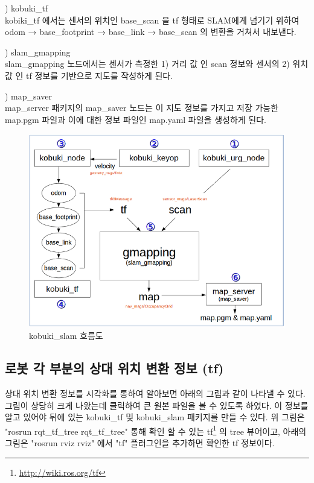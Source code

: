 \vspace{\baselineskip}
\noindent
{}
\thenum) kobuki\_tf\\
kobiki\_tf 에서는 센서의 위치인 base\_scan 을 tf 형태로 SLAM에게 넘기기 위하여 odom → base\_footprint → base\_link → base\_scan 의 변환을 거쳐서 내보낸다.

\vspace{\baselineskip}
\noindent
{}
\thenum) slam\_gmapping\\
slam\_gmapping 노드에서는 센서가 측정한 1) 거리 값 인 scan 정보와 센서의 2) 위치 값 인 tf 정보를 기반으로 지도를 작성하게 된다. 

\vspace{\baselineskip}
\noindent
{}
\thenum) map\_saver\\
map\_server 패키지의 map\_saver 노드는 이 지도 정보를 가지고 저장 가능한 map.pgm 파일과 이에 대한 정보 파일인 map.yaml 파일을 생성하게 된다.

\begin{figure}[h]
\centering
\includegraphics[width=\columnwidth]{pictures/chapter11/slam_flow.png}
\caption{kobuki\_slam 흐름도}
\end{figure}

\subsection{로봇 각 부분의 상대 위치 변환 정보 (tf)}

상대 위치 변환 정보를 시각화를 통하여 알아보면 아래의 그림과 같이 나타낼 수 있다. 그림이 상당히 크게 나왔는데 클릭하여 큰 원본 파일을 볼 수 있도록 하였다. 이 정보를 알고 있어야 뒤에 있는 kobuki\_tf 및 kobuki\_slam 패키지를 만들 수 있다. 위 그림은 "rosrun rqt\_tf\_tree rqt\_tf\_tree" 통해 확인 할 수 있는 tf\footnote{\url{http://wiki.ros.org/tf}} 의 tree 뷰어이고, 아래의 그림은 "rosrun rviz rviz" 에서 "tf" 플러그인을 추가하면 확인한 tf 정보이다. 

